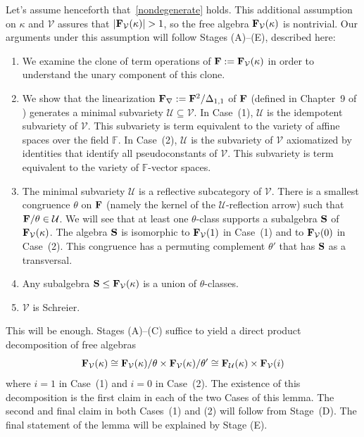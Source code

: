 \documentclass[12pt]{amsart}
\theoremstyle{definition}
\numberwithin{equation}{section}
\newcommand{\m}[1]{{\mathbf{\uppercase{#1}}}}
\begin{document}
Let's assume henceforth that~\eqref{nondegenerate} holds.
This additional assumption on $\kappa$ and $\mathcal{V}$ assures that
$|\m f_{\mathcal{V}}(\kappa)|>1$, so the free algebra $\m f_{\mathcal{V}}(\kappa)$
is nontrivial.
Our arguments under this assumption will follow Stages (A)--(E), described here:
  
\begin{enumerate}  
\item[(A)] We examine the clone of term operations
  of $\m f:=\m f_{\mathcal{V}}(\kappa)$ in order
  to understand the unary component of this clone.
\item[(B)] We show that the linearization
  $\m f_{\nabla}:=\m f^2/\Delta_{1,1}$ of $\m f$
  (defined in Chapter~9 of \cite{FM})
  generates a minimal
  subvariety $\mathcal{U}\subseteq \mathcal{V}$.
  In Case~(1), $\mathcal{U}$ is the idempotent subvariety
  of $\mathcal{V}$. This subvariety is term equivalent
  to the variety of affine spaces over the field $\mathbb{F}$.
  In Case~(2), $\mathcal{U}$
  is the subvariety of $\mathcal{V}$
  axiomatized by identities that
  identify all
  pseudoconstants of $\mathcal{V}$. This subvariety is term equivalent
  to the variety of $\mathbb{F}$-vector spaces.
\item[(C)]
  The minimal subvariety $\mathcal{U}$ is a reflective
  subcategory of $\mathcal{V}$.
There is a smallest
congruence $\theta$ on $\m f$ (namely the kernel of the
$\mathcal{U}$-reflection arrow)
such that
$\m f/\theta\in \mathcal{U}$. We will see that at least
one $\theta$-class supports a subalgebra $\m s$
of $\m f_{\mathcal{V}}(\kappa)$. The algebra $\m s$
is isomorphic to
$\m f_{\mathcal{V}}(1)$ in Case~(1) and to
$\m f_{\mathcal{V}}(0)$ in Case~(2).
This congruence has a permuting complement $\theta'$
that has $\m s$ as a transversal.
\item[(D)]
Any subalgebra
$\m s\leq \m f_{\mathcal V}(\kappa)$ is a union of $\theta$-classes.
\item[(E)]
$\mathcal{V}$ is Schreier.
\end{enumerate}
This will be enough. Stages (A)--(C)
suffice to yield a direct product decomposition
of free algebras
\[
\m f_{\mathcal{V}}(\kappa)\cong 
\m f_{\mathcal{V}}(\kappa)/\theta\times 
\m f_{\mathcal{V}}(\kappa)/\theta'\cong
\m f_{\mathcal{U}}(\kappa)\times \m f_{\mathcal{V}}(i)
\]
where $i=1$ in Case~(1) and $i=0$ in Case~(2).
The existence of this decomposition is
the first claim in each of the two Cases of this lemma.
The second and final claim in both Cases~(1) and (2)
will follow from Stage~(D).
The final statement of the lemma will be explained
by Stage (E).
  
\end{document}
